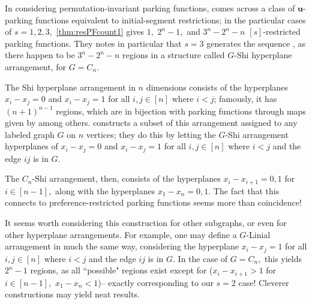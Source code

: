 \documentclass[12 pt]{amsart}
\theoremstyle{definition} %
\theoremstyle{remark} %
\begin{document}
In considering permutation-invariant parking functions, \cite{chen-2023} comes across a class of $\mathbf{u}$-parking functions equivalent to initial-segment restrictions; in the particular cases of $s=1,2,3,$ \cref{thm:resPFcount1} gives $1,$ $2^n-1,$ and $3^n-2^n-n$ $[s]$-restricted parking functions. They notes in particular that $s=3$ generates the sequence \cite[A001263]{oeis}, as there happen to be $3^n-2^n-n$ regions in a structure called $G$-Shi hyperplane arrangement, for $G=C_n.$

The Shi hyperplane arrangement in $n$ dimensions consists of the hyperplanes $x_i-x_j=0$ and $x_i-x_j=1$ for all $i,j\in[n]$ where $i<j$; famously, it has $(n+1)^{n-1}$ regions, which are in bijection with parking functions through maps given by \cite{athanasiadis-linusson-1999} among others. \cite{bennett-2024} constructs a subset of this arrangement assigned to any labeled graph $G$ on $n$ vertices; they do this by letting the $G$-Shi arrangement hyperplanes of $x_i-x_j=0$ and $x_i-x_j=1$ for all $i,j\in[n]$ where $i<j$ and the edge $ij$ is in $G.$

The $C_n$-Shi arrangement, then, consists of the hyperplanes $x_i-x_{i+1}=0,1$ for $i\in[n-1],$ along with the hyperplanes $x_1-x_n=0,1.$ The fact that this connects to preference-restricted parking functions seems more than coincidence!

It seems worth considering this construction for other subgraphs, or even for other hyperplane arrangements. For example, one may define a $G$-Linial arrangement in much the same way, considering the hyperplane $x_i-x_j=1$ for all $i,j\in[n]$ where $i<j$ and the edge $ij$ is in $G.$ In the case of $G=C_n,$ this yields $2^n-1$ regions, as all ``possible" regions exist except for ($x_i-x_{i+1}>1$ for $i\in[n-1],$ $x_1-x_n<1$)-- exactly corresponding to our $s=2$ case! Cleverer constructions may yield neat results.




\end{document}
